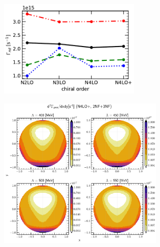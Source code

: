     \begin{figure}[h]
        \begin{center}
        \includegraphics[width=0.6\textwidth]{PlotData/PION/Dalitz_maps/figures/Gamma_nd.pdf}
        \end{center}
        \caption{}
        \label{Gamma_nd}
    \end{figure}

    \begin{figure}[h]
        \begin{center}
        \includegraphics[width=0.7\textwidth]{PlotData/PION/Dalitz_maps/figures/Dalitz_map_pnn_xy_cutofs.pdf}
        \end{center}
        \caption{}
        \label{pion_map_xy_cutoff}
    \end{figure}

